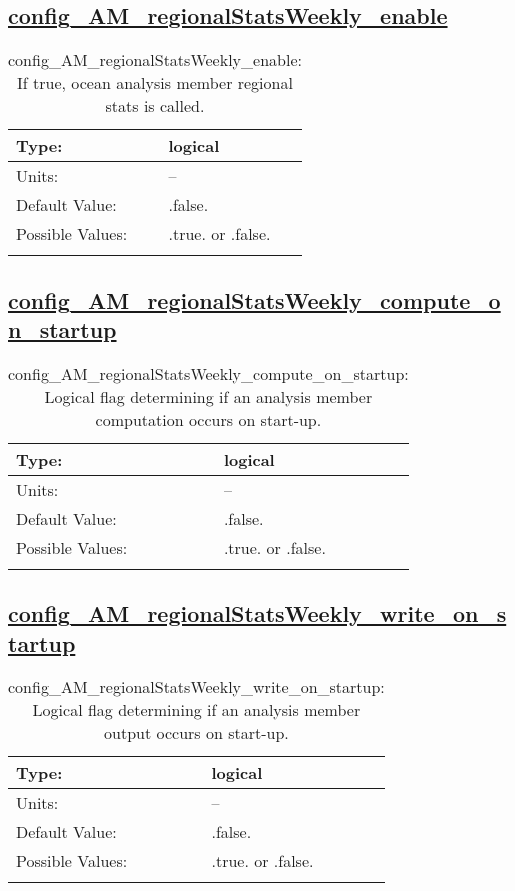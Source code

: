 \subsection[config\_AM\_regionalStatsWeekly\_enable]{\hyperref[sec:nm_tab_AM_regionalStatsWeekly]{config\_AM\_regionalStatsWeekly\_enable}}
\label{subsec:nm_sec_config_AM_regionalStatsWeekly_enable}
\begin{center}
\begin{longtable}{| p{2.0in} || p{4.0in} |}
    \hline
    Type: & logical \\
    \hline
    Units: & -- \\
    \hline
    Default Value: & .false. \\
    \hline
    Possible Values: & .true. or .false. \\
    \hline
    \caption{config\_AM\_regionalStatsWeekly\_enable: If true, ocean analysis member regional stats is called.}
\end{longtable}
\end{center}
\subsection[config\_AM\_regionalStatsWeekly\_compute\_on\_startup]{\hyperref[sec:nm_tab_AM_regionalStatsWeekly]{config\_AM\_regionalStatsWeekly\_compute\_on\_startup}}
\label{subsec:nm_sec_config_AM_regionalStatsWeekly_compute_on_startup}
\begin{center}
\begin{longtable}{| p{2.0in} || p{4.0in} |}
    \hline
    Type: & logical \\
    \hline
    Units: & -- \\
    \hline
    Default Value: & .false. \\
    \hline
    Possible Values: & .true. or .false. \\
    \hline
    \caption{config\_AM\_regionalStatsWeekly\_compute\_on\_startup: Logical flag determining if an analysis member computation occurs on start-up.}
\end{longtable}
\end{center}
\subsection[config\_AM\_regionalStatsWeekly\_write\_on\_startup]{\hyperref[sec:nm_tab_AM_regionalStatsWeekly]{config\_AM\_regionalStatsWeekly\_write\_on\_startup}}
\label{subsec:nm_sec_config_AM_regionalStatsWeekly_write_on_startup}
\begin{center}
\begin{longtable}{| p{2.0in} || p{4.0in} |}
    \hline
    Type: & logical \\
    \hline
    Units: & -- \\
    \hline
    Default Value: & .false. \\
    \hline
    Possible Values: & .true. or .false. \\
    \hline
    \caption{config\_AM\_regionalStatsWeekly\_write\_on\_startup: Logical flag determining if an analysis member output occurs on start-up.}
\end{longtable}
\end{center}
